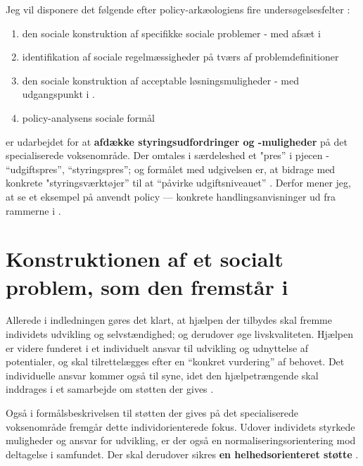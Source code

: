 Jeg vil disponere det følgende efter policy-arkæologiens fire undersøgelsesfelter \autocite[s. 300]{scheurichPolicyArchaeologyNew1994}:
\begin{enumerate}
  \item
    den sociale konstruktion af specifikke sociale problemer - med afsæt i 
  \item
    identifikation af sociale regelmæssigheder på tværs af problemdefinitioner
  \item
    den sociale konstruktion af acceptable løsningsmuligheder - med udgangspunkt i .
  \item
    policy-analysens sociale formål
\end{enumerate}

 er udarbejdet for at \textbf{afdække styringsudfordringer og -muligheder} på det specialiserede voksenområde.
Der omtales i særdeleshed et "pres” i pjecen - “udgiftspres”, “styringspres”; og formålet med udgivelsen er, at bidrage med konkrete "styringsværktøjer” til at “påvirke udgiftsniveauet” \autocite[s. 2, 3. m.fl.]{klStyringAfDet2017}.
Derfor mener jeg, at se et eksempel på anvendt policy — konkrete handlingsanvisninger ud fra rammerne i .

\section{Konstruktionen af et socialt problem, som den fremstår i }

Allerede i indledningen gøres det klart, at hjælpen der tilbydes skal fremme individets udvikling og selvstændighed; og derudover øge livskvaliteten.
Hjælpen er videre funderet i et individuelt ansvar til udvikling og udnyttelse af potentialer, og skal tilrettelægges efter en “konkret vurdering” af behovet.
Det individuelle ansvar kommer også til syne, idet den hjælpetrængende skal inddrages i et samarbejde om støtten der gives \autocite[§§ 2-3]{social-ogindenrigsministerietBekendtgorelseAfLov2019}.

Også i formålsbeskrivelsen til støtten der gives på det specialiserede voksenområde fremgår  dette individorienterede fokus.
Udover individets styrkede muligheder og ansvar for udvikling, er der også en normaliseringsorientering mod deltagelse i samfundet.
Der skal derudover sikres \textbf{en helhedsorienteret støtte} \autocite[§ 81]{social-ogindenrigsministerietBekendtgorelseAfLov2019}.

